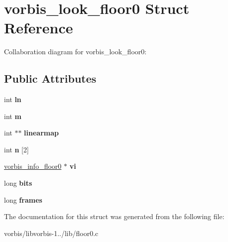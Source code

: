 \hypertarget{structvorbis__look__floor0}{\section{vorbis\+\_\+look\+\_\+floor0 Struct Reference}
\label{structvorbis__look__floor0}
}


Collaboration diagram for vorbis\+\_\+look\+\_\+floor0\+:
\subsection*{Public Attributes}
\begin{DoxyCompactItemize}
\item 
\hypertarget{structvorbis__look__floor0_aee9a6a8b6dccc47a80928209322cf83d}{int {\bfseries ln}}\label{structvorbis__look__floor0_aee9a6a8b6dccc47a80928209322cf83d}

\item 
\hypertarget{structvorbis__look__floor0_a2c97e5e8bd8f4e1e8ad0e75e76f614a2}{int {\bfseries m}}\label{structvorbis__look__floor0_a2c97e5e8bd8f4e1e8ad0e75e76f614a2}

\item 
\hypertarget{structvorbis__look__floor0_ad94c008fd959bf0111e3371a78385bbb}{int $\ast$$\ast$ {\bfseries linearmap}}\label{structvorbis__look__floor0_ad94c008fd959bf0111e3371a78385bbb}

\item 
\hypertarget{structvorbis__look__floor0_ad90f6b0d5838dd0cb8a17fa976611c94}{int {\bfseries n} \mbox{[}2\mbox{]}}\label{structvorbis__look__floor0_ad90f6b0d5838dd0cb8a17fa976611c94}

\item 
\hypertarget{structvorbis__look__floor0_ab48f65e22b5580857a356ea5bc95a971}{\hyperlink{structvorbis__info__floor0}{vorbis\+\_\+info\+\_\+floor0} $\ast$ {\bfseries vi}}\label{structvorbis__look__floor0_ab48f65e22b5580857a356ea5bc95a971}

\item 
\hypertarget{structvorbis__look__floor0_a7467d9fbcab1ebbc0fc56ecd1f4efa6b}{long {\bfseries bits}}\label{structvorbis__look__floor0_a7467d9fbcab1ebbc0fc56ecd1f4efa6b}

\item 
\hypertarget{structvorbis__look__floor0_a14e16b6b502677e8ec256f54838eb932}{long {\bfseries frames}}\label{structvorbis__look__floor0_a14e16b6b502677e8ec256f54838eb932}

\end{DoxyCompactItemize}


The documentation for this struct was generated from the following file\+:\begin{DoxyCompactItemize}
\item 
vorbis/libvorbis-\/1../lib/floor0.\+c\end{DoxyCompactItemize}
